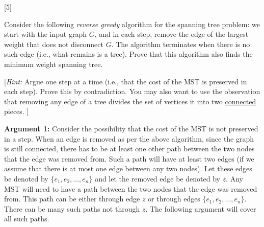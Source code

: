 \documentclass[addpoints]{exam}
\begin{document}
\begin{questions}

[5]

Consider the following {\em reverse greedy} algorithm for the spanning tree problem: we start with the input graph $G$, and in each step, remove the edge of the largest weight that does not disconnect $G$.  The algorithm terminates when there is no such edge (i.e., what remains is a tree). Prove that this algorithm also finds the minimum weight spanning tree.

[{\em Hint: } Argue one step at a time (i.e., that the cost of the MST is preserved in each step). Prove this by contradiction. You may also want to use the observation that removing any edge of a tree divides the set of vertices it into two \underline{connected} pieces. ]

\textbf{Argument 1:} Consider the possibility that the cost of the MST is not preserved in a step. When an edge is removed as per the above algorithm, since the graph is still connected, there has to be at least one other path between the two nodes that the edge was removed from. Such a path will have at least two edges (if we assume that there is at most one edge between any two nodes). Let these edges be denoted by $\{e_1,e_2,\ldots,e_n\}$ and let the removed edge be denoted by $z$. Any MST will need to have a path between the two nodes that the edge was removed from. This path can be either through edge $z$ or through edges $\{e_1,e_2,\ldots,e_n\}$. There can be many such paths not through $z$. The following argument will cover all such paths.


\end{questions}
\end{document}
